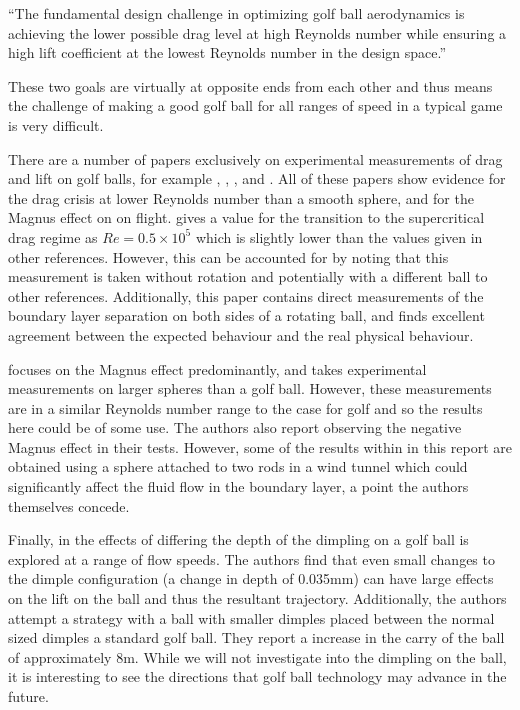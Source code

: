 ``The fundamental design challenge in optimizing golf ball aerodynamics is achieving the lower possible drag level at high Reynolds number while ensuring a high lift coefficient at the lowest Reynolds number in the design space.''

These two goals are virtually at opposite ends from each other and thus means the challenge of making
a good golf ball for all ranges of speed in a typical game is very difficult.

There are a number of papers exclusively on experimental measurements of drag and lift on golf balls, 
for example \citet{Bearman1976}, \citet{Kharlamov2007Magnus}, \citet{Naruo2014}, \citet{Kray2012} and \citet{Aoki2010}.
All of these papers show evidence for the drag crisis at lower Reynolds number than a smooth sphere,
and for the Magnus effect on on flight. \citet{Aoki2010} gives a value for the transition to the
supercritical drag regime as $Re = 0.5\times10^5$ which is slightly lower than the values given in
other references. However, this can be accounted for by noting that this measurement is taken without
rotation and potentially with a different ball to other references. Additionally, this paper contains
direct measurements of the boundary layer separation on both sides of a rotating ball, and finds 
excellent agreement between the expected behaviour and the real physical behaviour.

\citet{Kray2012} focuses on the Magnus effect predominantly, and takes experimental measurements on
larger spheres than a golf ball. However, these measurements are in a similar Reynolds number range
to the case for golf and so the results here could be of some use. The authors also report observing
the negative Magnus effect in their tests. However, some of the results within in this report are
obtained using a sphere attached to two rods in a wind tunnel which could significantly affect the fluid flow
in the boundary layer, a point the authors themselves concede.

Finally, in \citet{Naruo2014} the effects of differing the depth of the dimpling on a golf ball is 
explored at a range of flow speeds. The authors find that even small changes to the dimple configuration 
(a change in depth of 0.035mm)
can have large effects on the lift on the ball and thus the resultant trajectory. Additionally, the
authors attempt a strategy with a ball with smaller dimples placed between the normal sized dimples
a standard golf ball. They report a increase in the carry of the ball of approximately 8m. While we will not 
investigate into the dimpling on the ball, it is interesting to see the directions that golf ball
technology may advance in the future.

